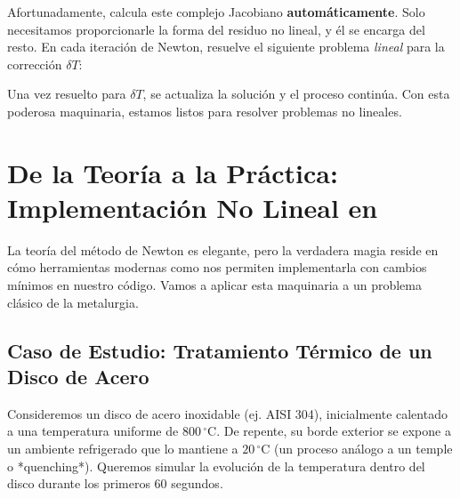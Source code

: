 Afortunadamente, \fenics calcula este complejo Jacobiano \textbf{automáticamente}. Solo necesitamos proporcionarle la forma del residuo no lineal, y él se encarga del resto. En cada iteración de Newton, \fenics resuelve el siguiente problema \textit{lineal} para la corrección \(\delta T\):

\begin{center}
\end{center}
Una vez resuelto para \(\delta T\), se actualiza la solución y el proceso continúa. Con esta poderosa maquinaria, estamos listos para resolver problemas no lineales.

\section{De la Teoría a la Práctica: Implementación No Lineal en \fenics}
\label{sec:nonlinear-fenics}
La teoría del método de Newton es elegante, pero la verdadera magia reside en cómo herramientas modernas como \fenics nos permiten implementarla con cambios mínimos en nuestro código. Vamos a aplicar esta maquinaria a un problema clásico de la metalurgia.

\subsection{Caso de Estudio: Tratamiento Térmico de un Disco de Acero}
Consideremos un disco de acero inoxidable (ej. AISI 304), inicialmente calentado a una temperatura uniforme de \(800 \, ^\circ\text{C}\). De repente, su borde exterior se expone a un ambiente refrigerado que lo mantiene a \(20 \, ^\circ\text{C}\) (un proceso análogo a un temple o *quenching*). Queremos simular la evolución de la temperatura dentro del disco durante los primeros 60 segundos.


